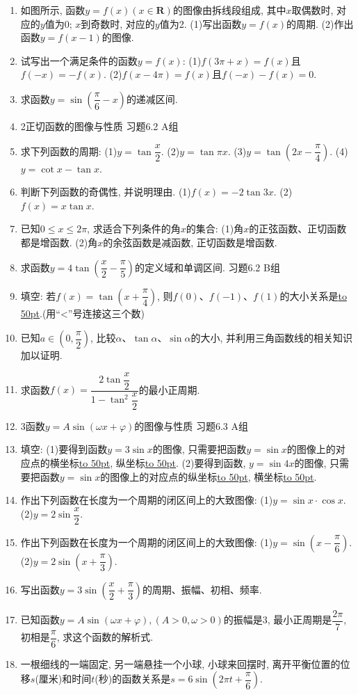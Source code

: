 \documentclass[10pt,a4paper]{article}
\newcommand{\blank}[1]{\underline{\hbox to #1pt{}}}
\begin{document}
\begin{enumerate}[1.]
\item 如图所示, 函数$y=f(x)(x\in \mathbf{R})$的图像由拆线段组成, 其中$x$取偶数时, 对应的$y$值为0; $x$到奇数时, 对应的$y$值为2.
(1)写出函数$y=f(x)$的周期.
(2)作出函数$y=f(x-1)$的图像.
\item 试写出一个满足条件的函数$y=f(x)$:
(1)$f(3\pi +x)=f(x)$且$f(-x)=-f(x)$.
(2)$f(x-4\pi)=f(x)$且$f(-x)-f(x)=0$.
\item 求函数$y=\sin (\dfrac{\pi }6-x)$的递减区间.
\item 2正切函数的图像与性质
习题6.2  A组
\item 求下列函数的周期:
(1)$y=\tan \dfrac x2$.							(2)$y=\tan \pi x$.
(3)$y=\tan (2x-\dfrac{\pi }4)$.					(4)$y=\cot x-\tan x$.
\item 判断下列函数的奇偶性, 并说明理由.
(1)$f(x)=-2\tan 3x$.					(2)$f(x)=x\tan x$.
\item 已知$0\le x\le 2\pi$, 求适合下列条件的角$x$的集合:
(1)角$x$的正弦函数、正切函数都是增函数.
(2)角$x$的余弦函数是减函数, 正切函数是增函数.
\item 求函数$y=4\tan (\dfrac x2-\dfrac{\pi }5)$的定义域和单调区间.
习题6.2  B组
\item 填空:
若$f(x)=\tan (x+\dfrac{\pi }4)$, 则$f(0)$、$f(-1)$、$f(1)$的大小关系是\blank{50}.(用``<''号连接这三个数)
\item 已知$a\in (0,\dfrac{\pi }2)$, 比较$\alpha$、$\tan \alpha$、$\sin \alpha$的大小, 并利用三角函数线的相关知识加以证明.
\item 求函数$f(x)=\dfrac{2\tan \dfrac x2}{1-{{\tan }^2}\dfrac x2}$的最小正周期.
\item 3函数$y=A\sin (\omega x+\varphi)$的图像与性质
习题6.3  A组
\item 填空:
(1)要得到函数$y=3\sin x$的图像, 只需要把函数$y=\sin x$的图像上的对应点的横坐标\blank{50}, 纵坐标\blank{50}.
(2)要得到函数, $y=\sin 4x$的图像, 只需要把函数$y=\sin x$的图像上的对应点的纵坐标\blank{50}, 横坐标\blank{50}.
\item 作出下列函数在长度为一个周期的闭区间上的大致图像:
(1)$y=\sin x\cdot \cos x$.					(2)$y=2\sin \dfrac x2$.
\item 作出下列函数在长度为一个周期的闭区间上的大致图像:
(1)$y=\sin (x-\dfrac{\pi }6)$.					(2)$y=2\sin (x+\dfrac{\pi }3)$.
\item 写出函数$y=3\sin (\dfrac x2+\dfrac{\pi }3)$的周期、振幅、初相、频率.
\item 已知函数$y=A\sin (\omega x+\varphi),(A>0,\omega >0)$的振幅是3, 最小正周期是$\dfrac{2\pi }7$, 初相是$\dfrac{\pi }6$, 求这个函数的解析式.
\item 一根细线的一端固定, 另一端悬挂一个小球, 小球来回摆时, 离开平衡位置的位移$s$(厘米)和时间$t$(秒)的函数关系是$s=6\sin (2\pi t+\dfrac{\pi }6)$.

\end{enumerate}
\end{document}
